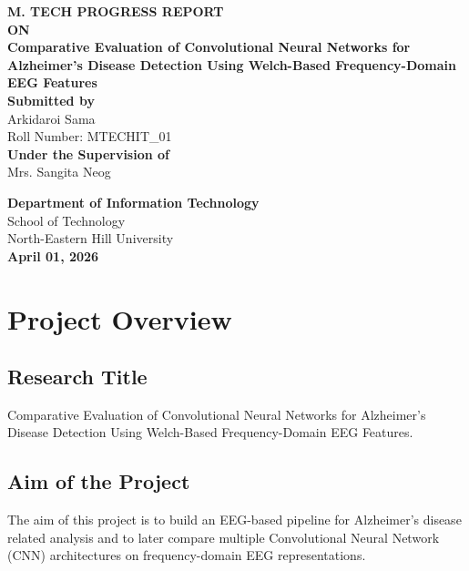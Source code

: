 \documentclass[12pt,a4paper]{article}
\begin{document}
\begin{titlepage}
    \centering
    \vspace*{1cm}

    {\LARGE\bfseries M. TECH PROGRESS REPORT}\\[1cm]

    {\LARGE\bfseries ON}\\[1cm]

    {\huge\bfseries Comparative Evaluation of Convolutional Neural Networks for Alzheimer’s Disease Detection Using Welch-Based Frequency-Domain EEG Features}\\[2cm]

    {\large\textbf{Submitted by}}\\[0.3cm]
    {\Large Arkidaroi Sama}\\[0.2cm]
    {\large Roll Number: MTECHIT\_01}\\[2cm]

    {\large\textbf{Under the Supervision of}}\\[0.3cm]
    {\Large Mrs. Sangita Neog}\\

    \vfill

    {\large\textbf{Department of Information Technology}}\\
    {\large School of Technology}\\
    {\large North-Eastern Hill University}\\[1.5cm]

    {\large\textbf{April 01, 2026}}
\end{titlepage}

\tableofcontents
\newpage

\section{Project Overview}

\subsection{Research Title}
Comparative Evaluation of Convolutional Neural Networks for Alzheimer’s Disease Detection Using Welch-Based Frequency-Domain EEG Features.

\subsection{Aim of the Project}
The aim of this project is to build an EEG-based pipeline for Alzheimer’s disease related analysis and to later compare multiple Convolutional Neural Network (CNN) architectures on frequency-domain EEG representations.
\end{document}
